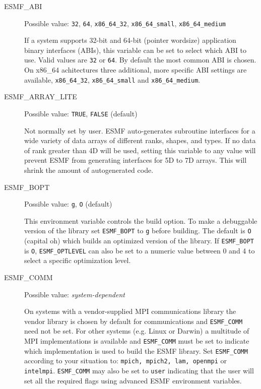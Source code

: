 \begin{description}

\item[ESMF\_ABI]
Possible value: {\tt 32}, {\tt 64}, {\tt x86\_64\_32}, {\tt x86\_64\_small}, {\tt x86\_64\_medium}

If a system supports 32-bit and 64-bit (pointer wordsize) application binary
interfaces (ABIs), this variable can be set to select which ABI to use. Valid 
values are {\tt 32} or {\tt 64}. By default the most common ABI is chosen. On
x86\_64 achitectures three additional, more specific ABI settings are available,
{\tt x86\_64\_32}, {\tt x86\_64\_small} and {\tt x86\_64\_medium}.

\item[ESMF\_ARRAY\_LITE]
Possible value: {\tt TRUE}, {\tt FALSE} (default)

Not normally set by user. ESMF auto-generates subroutine interfaces for a wide
variety of data arrays of different ranks, shapes, and types. If no data of
rank greater than 4D will be used, setting this variable to any value will
prevent ESMF from generating interfaces for 5D to 7D arrays. This will
shrink the amount of autogenerated code.

\item[ESMF\_BOPT] 
Possible value: {\tt g}, {\tt O} (default)

This environment variable controls the build option. To make a debuggable
version of the library set {\tt ESMF\_BOPT} to {\tt g} before building. The 
default is {\tt O} (capital oh) which builds an optimized version of the
library. If {\tt ESMF\_BOPT} is {\tt O}, {\tt ESMF\_OPTLEVEL} can also be set
to a numeric value between 0 and 4 to select a specific optimization level.

\item[ESMF\_COMM]
Possible value: {\em system-dependent}

On systems with a vendor-supplied MPI communications library the vendor library 
is chosen by default for communications and {\tt ESMF\_COMM} need not be set.
For other systems (e.g. Linux or Darwin) a multitude of MPI implementations is
available and {\tt ESMF\_COMM} must be set to indicate which implementation is
used to build the ESMF library. Set {\tt ESMF\_COMM} according to your situation
to: {\tt mpich, mpich2, lam, openmpi} or {\tt intelmpi}. {\tt ESMF\_COMM} may
also be set to {\tt user} indicating that the user will set all the required
flags using advanced ESMF environment variables.


\end{description}
